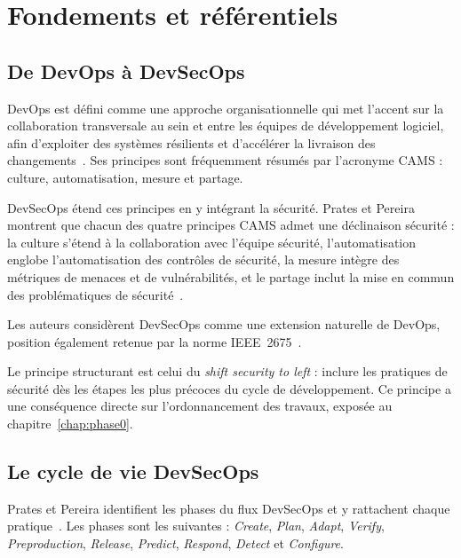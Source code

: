 \chapter{Fondements et référentiels}
\label{chap:fondements}

\section{De DevOps à DevSecOps}

DevOps est défini comme une approche organisationnelle qui met l'accent sur la
collaboration transversale au sein et entre les équipes de développement
logiciel, afin d'exploiter des systèmes résilients et d'accélérer la livraison
des changements~\cite{prates2025}. Ses principes sont fréquemment résumés par
l'acronyme CAMS : culture, automatisation, mesure et partage.

DevSecOps étend ces principes en y intégrant la sécurité. Prates et Pereira
montrent que chacun des quatre principes CAMS admet une déclinaison sécurité :
la culture s'étend à la collaboration avec l'équipe sécurité, l'automatisation
englobe l'automatisation des contrôles de sécurité, la mesure intègre des
métriques de menaces et de vulnérabilités, et le partage inclut la mise en
commun des problématiques de sécurité~\cite{prates2025}.

Les auteurs considèrent DevSecOps comme une extension naturelle de DevOps,
position également retenue par la norme IEEE~2675~\cite{ieee2675}.

Le principe structurant est celui du \emph{shift security to left} : inclure les
pratiques de sécurité dès les étapes les plus précoces du cycle de
développement. Ce principe a une conséquence directe sur l'ordonnancement des
travaux, exposée au chapitre~\ref{chap:phase0}.

\section{Le cycle de vie DevSecOps}

Prates et Pereira identifient les phases du flux DevSecOps et y rattachent
chaque pratique~\cite{prates2025}. Les phases sont les suivantes :
\emph{Create}, \emph{Plan}, \emph{Adapt}, \emph{Verify},
\emph{Preproduction}, \emph{Release}, \emph{Predict}, \emph{Respond},
\emph{Detect} et \emph{Configure}.

